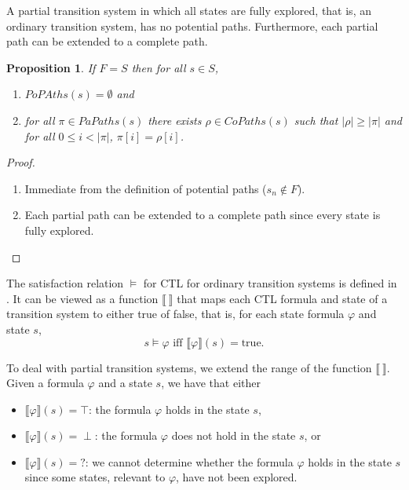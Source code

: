 \documentclass[12pt]{article}
\newtheorem{proposition}{Proposition}
\theoremstyle{definition}
\newcommand{\satisfaction}[1]{\llbracket #1 \rrbracket}
\newenvironment{franck}{\color{red}}{\color{black}}
\begin{document}
A partial transition system in which all states are fully explored, that is, an ordinary transition system, has no potential paths.  Furthermore, each partial path can be extended to a complete path.

\begin{franck}
\begin{proposition}
\label{proposition:no-potential-paths}
If $F= S$ then for all $s \in S$,
\begin{enumerate}
\item
$\mathit{PoPAths}(s) = \emptyset$ and
\item
for all $\pi \in \mathit{PaPaths}(s)$ there exists $\rho \in \mathit{CoPaths}(s)$ such that $|\rho| \geq |\pi|$ and for all $0 \leq i < |\pi|$, $\pi[i] = \rho[i]$.
\end{enumerate}
\end{proposition}
\begin{proof}\ 
\begin{enumerate}
\item 
Immediate from the definition of potential paths ($s_n \not\in F$).
\item
Each partial path can be extended to a complete path since every state is fully explored.
\end{enumerate}
\end{proof}
\end{franck}

The satisfaction relation $\models$ for CTL for ordinary transition systems is defined in \cite[Definition~6.4]{BK08}.  It can be viewed as a function $\satisfaction{\ }$ that maps each CTL formula and state of a transition system to either true of false, that is, for each state formula $\varphi$ and state $s$,
\[
s \models \varphi \mbox{ iff } \satisfaction{\varphi}(s) = \mbox{true}.
\]

To deal with partial transition systems, we extend the range of the function $\satisfaction{\ }$.  Given a formula $\varphi$ and a state $s$, we have that either
\begin{itemize}
\item 
$\satisfaction{\varphi}(s) = \top$: the formula $\varphi$ holds in the state $s$,
\item
$\satisfaction{\varphi}(s) = \perp$: the formula $\varphi$ does not hold in the state $s$, or
\item
$\satisfaction{\varphi}(s) = \mathord{?}$: we cannot determine whether the formula $\varphi$ holds in the state $s$ since some states, relevant to $\varphi$,  have not been explored.
\end{itemize}
\end{document}
